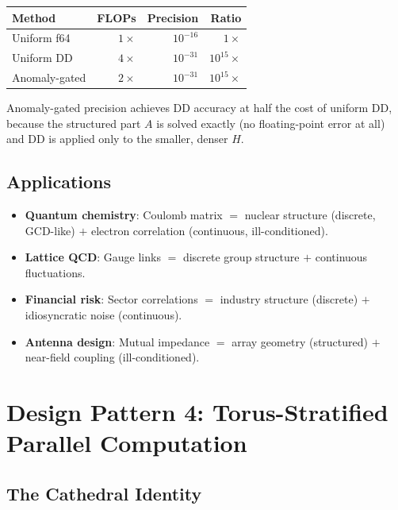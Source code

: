 \documentclass[11pt,a4paper]{article}
\begin{document}
\begin{center}
\begin{tabular}{@{}lrrr@{}}
\toprule
\textbf{Method} & \textbf{FLOPs} & \textbf{Precision} & \textbf{Ratio} \\
\midrule
Uniform f64 & $1\times$ & $10^{-16}$ & $1\times$ \\
Uniform DD & $4\times$ & $10^{-31}$ & $10^{15}\times$ \\
Anomaly-gated & $2\times$ & $10^{-31}$ & $10^{15}\times$ \\
\bottomrule
\end{tabular}
\end{center}

\noindent
Anomaly-gated precision achieves DD accuracy at half the cost of
uniform DD, because the structured part $A$ is solved exactly
(no floating-point error at all) and DD is applied only to the
smaller, denser $H$.

\subsection{Applications}

\begin{itemize}
  \item \textbf{Quantum chemistry}: Coulomb matrix $=$ nuclear
    structure (discrete, GCD-like) $+$ electron correlation
    (continuous, ill-conditioned).
  \item \textbf{Lattice QCD}: Gauge links $=$ discrete group
    structure $+$ continuous fluctuations.
  \item \textbf{Financial risk}: Sector correlations $=$ industry
    structure (discrete) $+$ idiosyncratic noise (continuous).
  \item \textbf{Antenna design}: Mutual impedance $=$ array geometry
    (structured) $+$ near-field coupling (ill-conditioned).
\end{itemize}

\section{Design Pattern 4: Torus-Stratified Parallel Computation}
\label{sec:torus}

\subsection{The Cathedral Identity}
\end{document}
